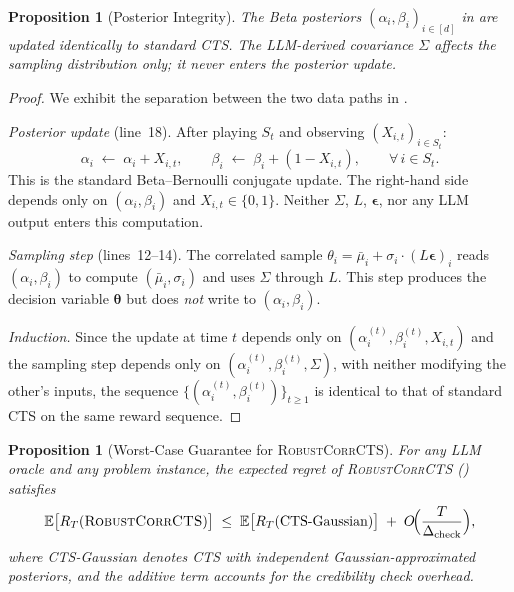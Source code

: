 \documentclass{article}
\theoremstyle{plain}
\newtheorem{proposition}[theorem]{Proposition}
\theoremstyle{definition}
\theoremstyle{remark}
\newcommand{\E}{\mathbb{E}}
\newcommand{\RobustCorr}{\textsc{RobustCorrCTS}}
\begin{document}
\medskip

\begin{proposition}[Posterior Integrity]\label{prop:integrity}
The Beta posteriors $(\alpha_i, \beta_i)_{i \in [d]}$ in  are updated identically to standard CTS.
The LLM-derived covariance $\Sigma$ affects the sampling distribution only; it never enters the posterior update.
\end{proposition}

\begin{proof}
We exhibit the separation between the two data paths in .

\textit{Posterior update} (line~18).
After playing $S_t$ and observing $(X_{i,t})_{i \in S_t}$:
\[
\alpha_i \;\leftarrow\; \alpha_i + X_{i,t}, \qquad
\beta_i  \;\leftarrow\; \beta_i + (1 - X_{i,t}), \qquad
\forall\, i \in S_t.
\]
This is the standard Beta--Bernoulli conjugate update.
The right-hand side depends only on $(\alpha_i, \beta_i)$ and $X_{i,t} \in \{0,1\}$.
Neither $\Sigma$, $L$, $\boldsymbol{\epsilon}$, nor any LLM output enters this computation.

\textit{Sampling step} (lines~12--14).
The correlated sample $\theta_i = \bar\mu_i + \sigma_i \cdot (L\boldsymbol{\epsilon})_i$ reads $(\alpha_i, \beta_i)$ to compute $(\bar\mu_i, \sigma_i)$ and uses $\Sigma$ through $L$.
This step produces the decision variable $\boldsymbol{\theta}$ but does \emph{not} write to $(\alpha_i, \beta_i)$.

\textit{Induction.}
Since the update at time $t$ depends only on $(\alpha_i^{(t)}, \beta_i^{(t)}, X_{i,t})$ and the sampling step depends only on $(\alpha_i^{(t)}, \beta_i^{(t)}, \Sigma)$, with neither modifying the other's inputs, the sequence $\{(\alpha_i^{(t)}, \beta_i^{(t)})\}_{t \geq 1}$ is identical to that of standard CTS on the same reward sequence.
\end{proof}

\medskip

\begin{proposition}[Worst-Case Guarantee for \RobustCorr{}]\label{prop:robust}
For any LLM oracle and any problem instance, the expected regret of \RobustCorr{} () satisfies
\[
\E\bigl[R_T(\RobustCorr{})\bigr]
  \;\leq\;
  \E\bigl[R_T(\textnormal{CTS-Gaussian})\bigr]
  \;+\;
  O\!\Bigl(\frac{T}{\Delta_{\mathrm{check}}}\Bigr),
\]
where \textnormal{CTS-Gaussian} denotes CTS with independent Gaussian-approximated posteriors, and the additive term accounts for the credibility check overhead.
\end{proposition}
\end{document}
